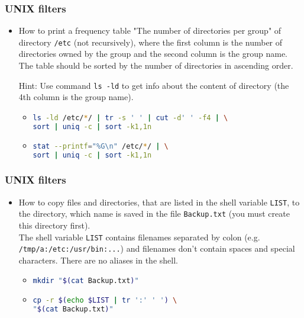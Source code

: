 \begin{frame}[fragile]
\frametitle{UNIX filters}
	\begin{itemize}
	
		\item How to print a frequency table "The number of directories per group" of directory \texttt{/etc} (not recursively),
			where the first column is the number of directories owned by the group
			and the second column is the group name. The table should be sorted by the number of directories in ascending order.
		
			\vspace{5mm}
			Hint: Use command \texttt{ls -ld} to get info about the content of directory (the 4th column is the group name). 		
		\begin{itemize}
			\item
\begin{lstlisting}[language=bash]		
ls -ld /etc/*/ | tr -s ' ' | cut -d' ' -f4 | \
sort | uniq -c | sort -k1,1n
\end{lstlisting}

			\item
\begin{lstlisting}[language=bash]
stat --printf="%G\n" /etc/*/ | \
sort | uniq -c | sort -k1,1n
\end{lstlisting}

		\end{itemize}
			
	\end{itemize}
\end{frame}

\begin{frame}[fragile]
\frametitle{UNIX filters}
	\begin{itemize}
	
		\item How to copy files and directories, that are listed in the shell variable \texttt{LIST},
			to the directory, which name is saved in the file \texttt{Backup.txt} (you must create this directory first).\\
			The shell variable \texttt{LIST} contains filenames separated by colon (e.g.  \texttt{/tmp/a:/etc:/usr/bin:...})
			and filenames don't contain spaces and special characters. There are no aliases in the shell.
					

		\begin{itemize}
			\item
\begin{lstlisting}[language=bash]		
mkdir "$(cat Backup.txt)"
\end{lstlisting}

			\item
\begin{lstlisting}[language=bash]		
cp -r $(echo $LIST | tr ':' ' ') \
"$(cat Backup.txt)"
\end{lstlisting}
		\end{itemize}
			
	\end{itemize}
\end{frame}


